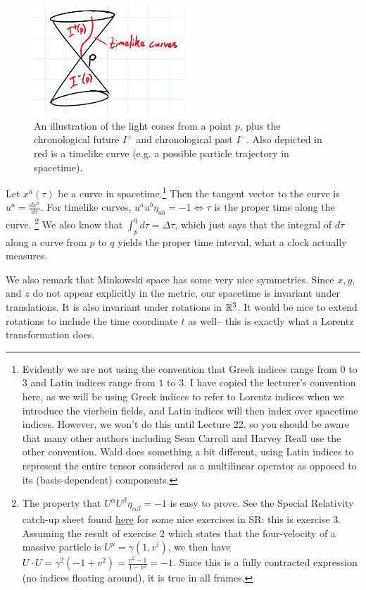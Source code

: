 \begin{figure}
\includegraphics[width=0.5\textwidth]{2018/10/20181005_img1}
\caption{An illustration of the light cones from a point $p$, plus the chronological future $I^+$ and chronological past $I^-$. Also depicted in red is a timelike curve (e.g. a possible particle trajectory in spacetime).}
\end{figure}

Let $x^a(\tau)$ be a curve in spacetime.\footnote{Evidently we are not using the convention that Greek indices range from $0$ to $3$ and Latin indices range from $1$ to $3$. I have copied the lecturer's convention here, as we will be using Greek indices to refer to Lorentz indices when we introduce the vierbein fields, and Latin indices will then index over spacetime indices. However, we won't do this until Lecture 22, so you should be aware that many other authors including Sean Carroll and Harvey Reall use the other convention. Wald does something a bit different, using Latin indices to represent the entire tensor considered as a multilinear operator as opposed to its (basis-dependent) components.} Then the tangent vector to the curve is $u^a=\frac{dx^a}{d\tau}$. For timelike curves, $u^a u^b \eta_{ab}=-1 \iff \tau$ is the proper time along the curve.
\footnote{The property that $U^\alpha U^\beta \eta_{\alpha\beta}=-1$ is easy to prove. See the Special Relativity catch-up sheet found \href{http://www.maths.cam.ac.uk/sites/www.maths.cam.ac.uk/files/grspecialrelativity.pdf}{here} for some nice exercises in SR: this is exercise 3. Assuming the result of exercise 2 which states that the four-velocity of a massive particle is $U^\mu=\gamma(1,v^i)$, we then have $U\cdot U =\gamma^2(-1+v^2)=\frac{v^2-1}{1-v^2}=-1$. Since this is a fully contracted expression (no indices floating around), it is true in all frames.}
We also know that $\int_p^q d\tau = \Delta \tau$, which just says that the integral of $d\tau$ along a curve from $p$ to $q$ yields the proper time interval, what a clock actually measures.

We also remark that Minkowski space has some very nice symmetries. Since $x,y,$ and $z$ do not appear explicitly in the metric, our spacetime is invariant under translations. It is also invariant under rotations in $\mathbb{R}^3$. It would be nice to extend rotations to include the time coordinate $t$ as well-- this is exactly what a Lorentz transformation does.

